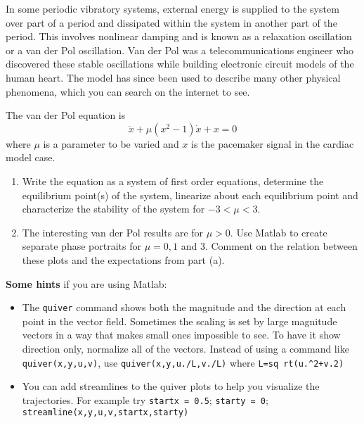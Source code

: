 \documentclass[12pt,letterpaper]{hmcpset}
\begin{document}
	
	
	\begin{problem}[1]
		In some periodic vibratory systems, external energy is supplied to the system over part of a
		period and dissipated within the system in another part of the period. This involves nonlinear
		damping and is known as a relaxation oscillation or a van der Pol oscillation. Van der Pol
		was a telecommunications engineer who discovered these stable oscillations while building
		electronic circuit models of the human heart. The model has since been used to describe
		many other physical phenomena, which you can search on the internet to see.
		
		The van der Pol equation is
		$$\ddot{x} + \mu (x^2 - 1)\dot{x} + x = 0$$
		where $\mu$ is a parameter to be varied and $x$ is the pacemaker signal in the cardiac model case.
		\begin{enumerate}
			\item Write the equation as a system of first order equations, determine the equilibrium point(s)
			of the system, linearize about each equilibrium point and characterize the stability of the
			system for $-3 < \mu < 3$.
			
			\item The interesting van der Pol results are for $\mu > 0$. Use Matlab to create separate phase
			portraits for $\mu = 0, 1$ and 3. Comment on the relation between these plots and the
			expectations from part (a).
		\end{enumerate}
		\textbf{Some hints} if you are using Matlab:
		\begin{itemize}
			\item The \texttt{quiver} command shows both the magnitude and the direction at each point
			in the vector field. Sometimes the scaling is set by large magnitude vectors in
			a way that makes small ones impossible to see. To have it show direction only,
			normalize all of the vectors. Instead of using a command like \texttt{quiver(x,y,u,v)},
			use \texttt{quiver(x,y,u./L,v./L)} where \texttt{L=sq rt(u.\^{}2+v.2)}
			
			\item You can add streamlines to the quiver plots to help you visualize the trajectories. For
			example try \texttt{startx = 0.5}; \texttt{starty = 0}; \texttt{streamline(x,y,u,v,startx,starty)}
		\end{itemize}
	\end{problem}
	
	
	\begin{solution}
		\vfill
	\end{solution}
	
\end{document}
